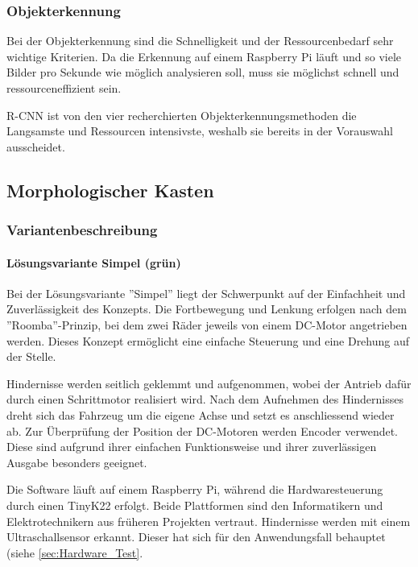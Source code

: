 \documentclass[../main.tex]{subfiles}
\begin{document}
\subsubsection{Objekterkennung}

Bei der Objekterkennung sind die Schnelligkeit und der Ressourcenbedarf sehr wichtige Kriterien.
Da die Erkennung auf einem Raspberry Pi läuft und so viele Bilder pro Sekunde wie möglich analysieren soll, muss sie möglichst schnell und ressourceneffizient sein. 

R-CNN ist von den vier recherchierten Objekterkennungsmethoden die Langsamste und Ressourcen intensivste, weshalb sie bereits in der Vorauswahl ausscheidet.


\subsection{Morphologischer Kasten}



    \subsubsection{Variantenbeschreibung}
    \paragraph{Lösungsvariante Simpel (grün)} 
    \label{a3:loesungsvariante_Simpel}
    Bei der Lösungsvariante ''Simpel'' liegt der Schwerpunkt auf der Einfachheit und Zuverlässigkeit des Konzepts. Die Fortbewegung und Lenkung erfolgen nach dem ''Roomba''-Prinzip, bei dem zwei Räder jeweils von einem DC-Motor angetrieben werden. Dieses Konzept ermöglicht eine einfache Steuerung und eine Drehung auf der Stelle.

    Hindernisse werden seitlich geklemmt und aufgenommen, wobei der Antrieb dafür durch einen Schrittmotor realisiert wird. Nach dem Aufnehmen des Hindernisses dreht sich das Fahrzeug um die eigene Achse und setzt es anschliessend wieder ab. Zur Überprüfung der Position der DC-Motoren werden Encoder verwendet. Diese sind aufgrund ihrer einfachen Funktionsweise und ihrer zuverlässigen Ausgabe besonders geeignet.

    Die Software läuft auf einem Raspberry Pi, während die Hardwaresteuerung durch einen TinyK22 erfolgt. Beide Plattformen sind den Informatikern und Elektrotechnikern aus früheren Projekten vertraut. Hindernisse werden mit einem Ultraschallsensor erkannt. Dieser hat sich für den Anwendungsfall behauptet (siehe \ref{sec:Hardware_Test}. 
\end{document}
